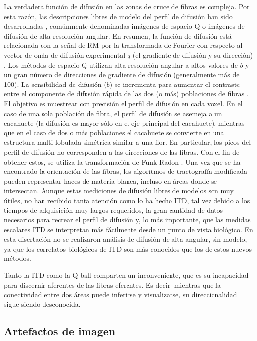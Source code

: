 La verdadera función de difusión en las zonas de cruce de fibras es compleja. Por esta razón, las descripciones libres de modelo del perfil de difusión han sido desarrolladas \cite{Alexander_2002,Tuch_2004}, comúnmente denominadas imágenes de espacio Q o imágenes de difusión de alta resolución angular. En resumen, la función de difusión está relacionada con la señal de RM por la transformada de Fourier con respecto al vector de onda de difusión experimental $q$ (el gradiente de difusión y su dirección) \cite{Stejskal_1965, Tuch_2004}. Los métodos de espacio Q utilizan alta resolución angular a altos valores de $b$ y un gran número de direcciones de gradiente de difusión (generalmente más de 100). La sensibilidad de difusión ($b$) se incrementa para aumentar el contraste entre el componente de difusión rápida de las dos (o más) poblaciones de fibras \cite{Tuch_2003}. El objetivo es muestrear con precisión el perfil de difusión en cada voxel. En el caso de una sola población de fibra, el perfil de difusión se asemeja a un cacahuete (la difusión es mayor sólo en el eje principal del cacahuete), mientras que en el caso de dos o más poblaciones el cacahuete se convierte en una estructura multi-lobulada simétrica similar a una flor. En particular, los picos del perfil de difusión no corresponden a las direcciones de las fibras. Con el fin de obtener estos, se utiliza  la transformación de Funk-Radon \cite{Tuch_2004}. Una vez que se ha encontrado la orientación de las fibras, los algoritmos de tractografía modificada pueden representar haces de materia blanca, incluso en áreas donde se intersectan. Aunque estas mediciones de difusión libres de modelos son muy útiles, no han recibido tanta atención como lo ha hecho ITD, tal vez debido a los tiempos de adquisición muy largos requeridos, la gran cantidad de datos necesarios para recrear el perfil de difusión y, lo más importante, que las medidas escalares ITD se interpretan más fácilmente desde un punto de vista biológico. En esta disertación no se realizaron análisis de difusión de alta angular, sin modelo, ya que los correlatos biológicos de ITD son más conocidos que los de estos nuevos métodos.

Tanto la ITD como la Q-ball comparten un inconveniente, que es su incapacidad para discernir aferentes de las fibras eferentes. Es decir, mientras que la conectividad entre dos áreas puede inferirse y visualizarse, su direccionalidad sigue siendo desconocida.

\subsection{Artefactos de imagen}
\label{lable:ArtefactosDWI}

